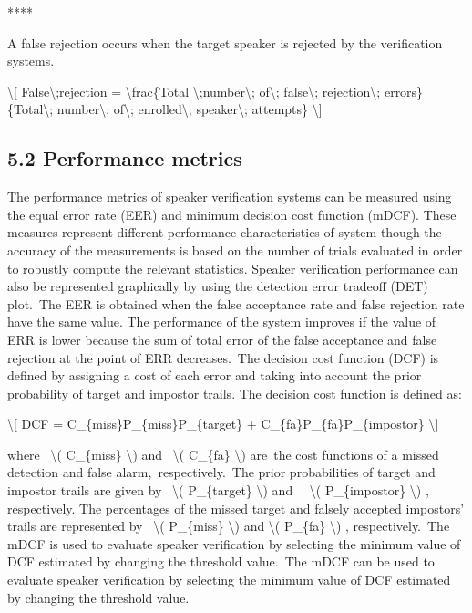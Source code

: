 \documentclass[letterpaper,10pt,english]{jupyterBook}
\begin{document}
\sphinxAtStartPar
****

\sphinxAtStartPar
{} A false rejection occurs when the target speaker is
rejected by the verification systems.

\sphinxAtStartPar
\textbackslash{}{[} False\textbackslash{};rejection = \textbackslash{}frac\{Total \textbackslash{};number\textbackslash{}; of\textbackslash{}; false\textbackslash{};
rejection\textbackslash{}; errors\} \{Total\textbackslash{}; number\textbackslash{}; of\textbackslash{}; enrolled\textbackslash{}; speaker\textbackslash{};
attempts\} \textbackslash{}{]}


\subsection{5.2 Performance metrics}
\label{\detokenize{Recognition/Speaker_Recognition_and_Verification:performance-metrics}}
\sphinxAtStartPar
The performance metrics of speaker verification systems can be measured
using the equal error rate (EER) and minimum decision cost function
(mDCF). These measures represent different performance characteristics
of system though the accuracy of the measurements is based on the number
of trials evaluated in order to robustly compute the relevant
statistics. Speaker verification performance can also be represented
graphically by using the detection error trade\sphinxhyphen{}off (DET) plot. The EER
is obtained when the false acceptance rate and false rejection rate have
the same value. The performance of the system improves if the value of
ERR is lower because the sum of total error of the false acceptance and
false rejection at the point of ERR decreases. The decision cost
function (DCF) is defined by assigning a cost of each error and taking
into account the prior probability of target and impostor trails. The
decision cost function is defined as:

\sphinxAtStartPar
\textbackslash{}{[} DCF = C\_\{miss\}P\_\{miss\}P\_\{target\} + C\_\{fa\}P\_\{fa\}P\_\{impostor\}
\textbackslash{}{]}

\sphinxAtStartPar
where  \textbackslash{}( C\_\{miss\} \textbackslash{}) and  \textbackslash{}( C\_\{fa\} \textbackslash{}) are the cost functions of
a missed detection and false alarm, respectively. The prior
probabilities of target and impostor trails are given by  \textbackslash{}(
P\_\{target\} \textbackslash{}) and   \textbackslash{}( P\_\{impostor\} \textbackslash{}) , respectively. The
percentages of the missed target and falsely accepted impostors’ trails
are represented by  \textbackslash{}( P\_\{miss\} \textbackslash{}) and \textbackslash{}( P\_\{fa\} \textbackslash{}) ,
respectively. The mDCF is used to evaluate speaker verification by
selecting the minimum value of DCF estimated by changing the threshold
value. The mDCF can be used to evaluate speaker verification by
selecting the minimum value of DCF estimated by changing the threshold
value.
\end{document}
